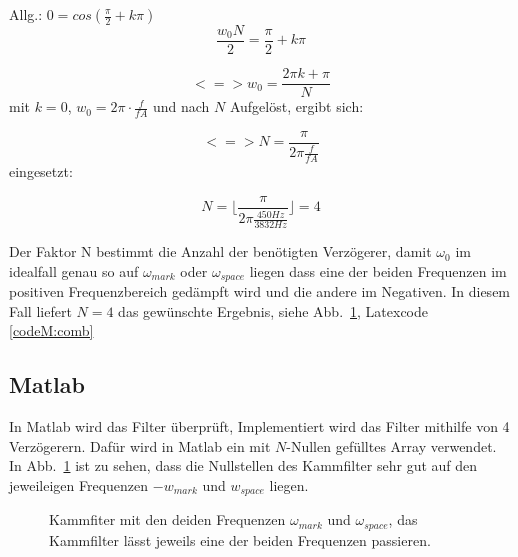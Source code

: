 \documentclass{article}
\begin{document}
Allg.: $0 = cos(\frac{\pi}{2} + k\pi)$
$$
\frac{w_0 N}{2} = \frac{\pi}{2} + k\pi
$$

$$
<=> w_0 = \frac{2\pi k + \pi}{N}
$$
mit $k = 0$, $w_0 = 2\pi \cdot \frac{f}{fA}$ und nach $N$ Aufgelöst, ergibt sich:

$$
<=> N = \frac{\pi}{2\pi \frac{f}{fA}}
$$
eingesetzt:

$$
N = \lfloor \frac{\pi}{2\pi \frac{450Hz}{3832Hz}}\rfloor = 4
$$

Der Faktor N bestimmt die Anzahl der benötigten Verzögerer, damit $\omega_0$ im idealfall genau so auf $\omega_{mark}$ oder $\omega_{space}$ liegen dass eine der beiden 
Frequenzen im positiven Frequenzbereich gedämpft wird und die andere im Negativen. In diesem Fall liefert $N = 4$ das gewünschte Ergebnis, siehe Abb.~\ref{fig:comb}, Latexcode \ref{codeM:comb}

\subsection{Matlab}
In Matlab wird das Filter überprüft, Implementiert wird das Filter mithilfe von 4 Verzögerern.
Dafür wird in Matlab ein mit $N$-Nullen gefülltes Array verwendet. In Abb.~\ref{fig:comb} ist zu sehen,
dass die Nullstellen des Kammfilter sehr gut auf den jeweileigen Frequenzen $- w_{mark}$ und $w_{space}$ liegen.

%    
%    

\begin{figure}[!h]
    \label{fig:comb}
    \centering
    \def\svgscale{0.3}
    \def\svgwidth{0.8\columnwidth}
    
    \caption{Kammfiter mit den deiden Frequenzen $\omega_{mark}$ und $\omega_{space}$, das Kammfilter lässt jeweils eine der beiden Frequenzen passieren.}
\end{figure}
\end{document}
